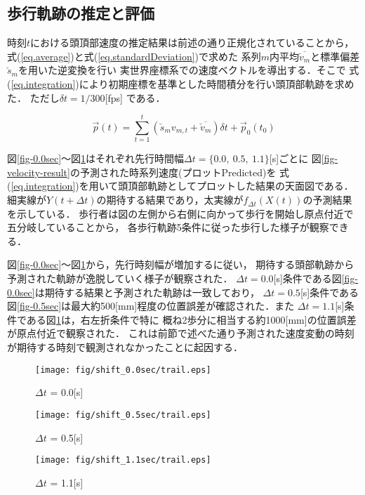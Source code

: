 \documentclass{sigchi}
\begin{document}
\subsection{歩行軌跡の推定と評価}

時刻$t$における頭頂部速度の推定結果は前述の通り正規化されていることから，
式(\ref{eq.average})と式(\ref{eq.standardDeviation})で求めた
系列$m$内平均$\overline{\check{v}_{m}} $と標準偏差$\check{s}_m$を用いた逆変換を行い
実世界座標系での速度ベクトルを導出する．そこで
式(\ref{eq.integration})により初期座標を基準とした時間積分を行い頭頂部軌跡を求めた．
ただし$\delta t = 1/300 $[fps] である．

\begin{equation}
\vec{p}(t) = \sum^{t}_{t=1}(\check{s}_m  v_{m,t} +  \overline{\check{v}_{m}})  \delta t+ \vec{p}_0(t_0)
\label{eq.integration}
\end{equation}


図\ref{fig-0.0sec}〜図\ref{fig-1.1sec}はそれぞれ先行時間幅$\Delta  t =\{0.0, \ 0.5,\  1.1\} $[s]ごとに
図\ref{fig-velocity-result}の予測された時系列速度(プロットPredicted)を
式(\ref{eq.integration})を用いて頭頂部軌跡としてプロットした結果の天面図である．
細実線が$Y(t+\Delta t)$の期待する結果であり，太実線が$f_{\Delta t}(X(t))$の予測結果を示している．
歩行者は図の左側から右側に向かって歩行を開始し原点付近で五分岐していることから，
各歩行軌跡5条件に従った歩行した様子が観察できる．

図\ref{fig-0.0sec}〜図\ref{fig-1.1sec}から，先行時刻幅が増加するに従い，
期待する頭部軌跡から予測された軌跡が逸脱していく様子が観察された．
$\Delta t = 0.0$[s]条件である図\ref{fig-0.0sec}は期待する結果と予測された軌跡は一致しており，
$\Delta t = 0.5$[s]条件である図\ref{fig-0.5sec}は最大約500[mm]程度の位置誤差が確認された．また
$\Delta t = 1.1$[s]条件である図\ref{fig-1.1sec}は，右左折条件で特に
概ね2歩分に相当する約1000[mm]の位置誤差が原点付近で観察された．
これは前節で述べた通り予測された速度変動の時刻が期待する時刻で観測されなかったことに起因する．


\begin{figure}[tb]
  \begin{center}
    \texttt{[image: fig/shift\_0.0sec/trail.eps]}
  \end{center}
  \vspace*{-10mm}
  \caption{$\Delta t$ = 0.0[s]}
  \label{fig-0.0sec}

  \begin{center}
      \texttt{[image: fig/shift\_0.5sec/trail.eps]}
  \end{center}
  \vspace*{-10mm}
  \caption{$\Delta t$ = 0.5[s]}
  \label{fig-0.5sec}


  \begin{center}
    \texttt{[image: fig/shift\_1.1sec/trail.eps]}
  \end{center}
  \vspace*{-10mm}
  \caption{$\Delta t$ = 1.1[s]}
  \label{fig-1.1sec}
\end{figure}
\end{document}
